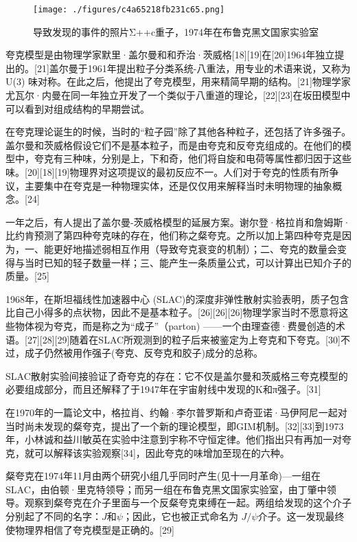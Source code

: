 \begin{figure}[ht]
\centering
\texttt{[image: ./figures/c4a65218fb231c65.png]}
\caption{导致发现的事件的照片Σ++c重子，1974年在布鲁克黑文国家实验室} \label{fig_Quark_4}
\end{figure}
夸克模型是由物理学家默里·盖尔曼和和乔治·茨威格[18][19]在[20]1964年独立提出的。[21]盖尔曼于1961年提出粒子分类系统-八重法，用专业的术语来说，又称为U(3) 味对称。在此之后，他提出了夸克模型，用来精简早期的结构。[21]物理学家尤瓦尔·内曼在同一年独立开发了一个类似于八重道的理论，[22][23]在坂田模型中可以看到对组成结构的早期尝试。

在夸克理论诞生的时候，当时的“粒子园”除了其他各种粒子，还包括了许多强子。盖尔曼和茨威格假设它们不是基本粒子，而是由夸克和反夸克组成的。在他们的模型中，夸克有三种味，分别是上，下和奇，他们将自旋和电荷等属性都归因于这些味。[20][18][19]物理界对这项提议的最初反应不一。人们对于夸克的性质有所争议，主要集中在夸克是一种物理实体，还是仅仅用来解释当时未明物理的抽象概念。[24]

一年之后，有人提出了盖尔曼-茨威格模型的延展方案。谢尔登·格拉肖和詹姆斯·比约肯预测了第四种夸克味的存在，他们称之粲夸克。之所以加上第四种夸克是因为，一、能更好地描述弱相互作用（导致夸克衰变的机制）；二、夸克的数量会变得与当时已知的轻子数量一样；三、能产生一条质量公式，可以计算出已知介子的质量。[25]

1968年，在斯坦福线性加速器中心 (SLAC)的深度非弹性散射实验表明，质子包含比自己小得多的点状物，因此不是基本粒子。[26][26][26]物理学家当时不愿意将这些物体视为夸克，而是称之为“成子”（parton) ——一个由理查德·费曼创造的术语。[27][28][29]随着在SLAC所观测到的粒子后来被鉴定为上夸克和下夸克。[30]不过，成子仍然被用作强子(夸克、反夸克和胶子)成分的总称。

SLAC散射实验间接验证了奇夸克的存在：它不仅是盖尔曼和茨威格三夸克模型的必要组成部分，而且还解释了于1947年在宇宙射线中发现的K和π强子。[31]

在1970年的一篇论文中，格拉肖、约翰·李尔普罗斯和卢奇亚诺·马伊阿尼一起对当时尚未发现的粲夸克，提出了一个新的理论模型，即GIM机制。[32][33]到1973年，小林诚和益川敏英在实验中注意到宇称不守恒定律。他们指出只有再加一对夸克，就可以解释该实验观察[34]，因此夸克的味增加至现在的六种。

粲夸克在1974年11月由两个研究小组几乎同时产生(见十一月革命)—一组在SLAC，由伯顿·里克特领导；而另一组在布鲁克黑文国家实验室，由丁肇中领导。观察到粲夸克在介子里面与一个反粲夸克束缚在一起。两组给发现的这个介子分别起了不同的名字：$J$和$\psi$；因此，它也被正式命名为 $J/\psi$介子。这一发现最终使物理界相信了夸克模型是正确的。[29]

